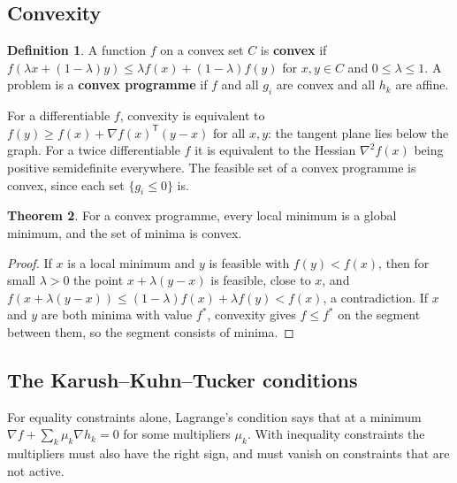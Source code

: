 \documentclass[11pt,a4paper]{article}
\numberwithin{equation}{section}
\theoremstyle{definition}
\newtheorem{thm}{Theorem}[subsection]
\newtheorem{defn}[thm]{Definition}
\begin{document}
\subsection{Convexity}
\label{ssec:convexity}

\begin{defn}
A function $f$ on a convex set $C$ is \textbf{convex} if $f(\lambda x + (1 - \lambda)y) \leq \lambda f(x) + (1 - \lambda)f(y)$ for $x, y \in C$ and $0 \leq \lambda \leq 1$. A problem is a \textbf{convex programme} if $f$ and all $g_i$ are convex and all $h_k$ are affine.
\end{defn}

For a differentiable $f$, convexity is equivalent to $f(y) \geq f(x) + \nabla f(x)^{\mathsf T}(y - x)$ for all $x, y$: the tangent plane lies below the graph. For a twice differentiable $f$ it is equivalent to the Hessian $\nabla^2f(x)$ being positive semidefinite everywhere. The feasible set of a convex programme is convex, since each set
$\{g_i \leq 0\}$ is.

\begin{thm}
\label{thm:localglobal}
For a convex programme, every local minimum is a global minimum, and the set of minima is convex.
\end{thm}

\begin{proof}
If $x$ is a local minimum and $y$ is feasible with $f(y) < f(x)$, then for small $\lambda > 0$ the point $x + \lambda(y - x)$ is feasible, close to $x$, and $f(x + \lambda(y - x)) \leq (1 - \lambda)f(x) + \lambda f(y) < f(x)$, a contradiction. If $x$ and $y$ are both minima with value $f^*$, convexity gives
$f \leq f^*$ on the segment between them, so the segment consists of minima.
\end{proof}

\subsection{The Karush--Kuhn--Tucker conditions}
\label{ssec:kkt}

For equality constraints alone, Lagrange's condition says that at a minimum $\nabla f + \sum_k\mu_k\nabla h_k = 0$ for some multipliers $\mu_k$. With inequality constraints the multipliers must also have the right sign, and must vanish on constraints that are not active.
\end{document}
